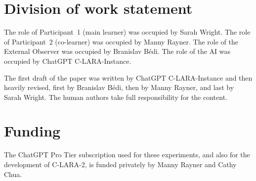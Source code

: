 \documentclass[11pt,a4paper]{article}
\begin{document}
\section*{Division of work statement}

The role of Participant~1 (main learner) was occupied by Sarah Wright. The role of Participant~2 (co-learner) was occupied by Manny Rayner. The role of the External Observer was occupied by Branislav B\'{e}di. The role of the AI was occupied by ChatGPT C-LARA-Instance.

The first draft of the paper was written by ChatGPT C-LARA-Instance and then heavily revised, first by Branislav B\'{e}di, then by Manny Rayner, and last by Sarah Wright. The human authors take full responsibility for the content.

\section*{Funding}

The ChatGPT Pro Tier subscription used for these experiments, and also for the development of C-LARA-2, is funded privately by Manny Rayner and Cathy Chua.



\end{document}
